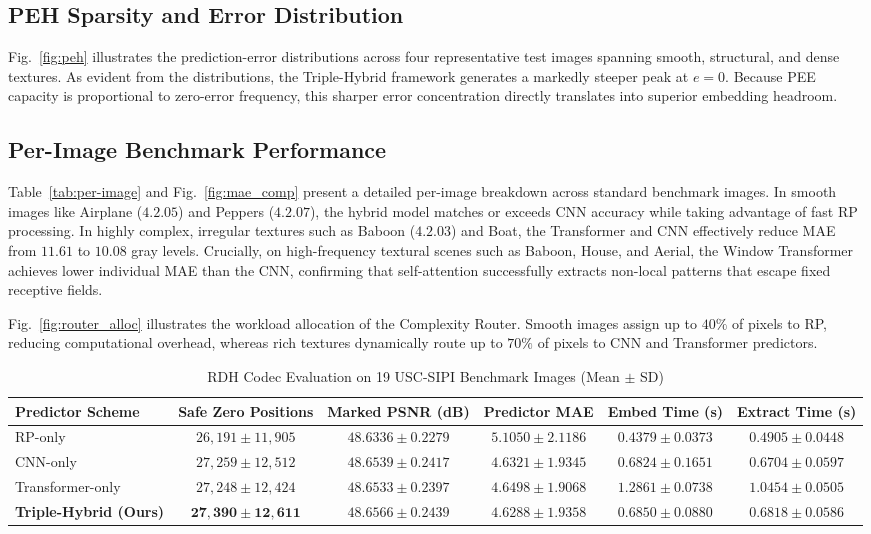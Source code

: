\documentclass[conference]{IEEEtran}
\begin{document}
\subsection{PEH Sparsity and Error Distribution}
Fig.~\ref{fig:peh} illustrates the prediction-error distributions across four representative test images spanning smooth, structural, and dense textures. As evident from the distributions, the Triple-Hybrid framework generates a markedly steeper peak at $e=0$. Because PEE capacity is proportional to zero-error frequency, this sharper error concentration directly translates into superior embedding headroom.

\subsection{Per-Image Benchmark Performance}
Table~\ref{tab:per-image} and Fig.~\ref{fig:mae_comp} present a detailed per-image breakdown across standard benchmark images. In smooth images like Airplane ($4.2.05$) and Peppers ($4.2.07$), the hybrid model matches or exceeds CNN accuracy while taking advantage of fast RP processing. In highly complex, irregular textures such as Baboon ($4.2.03$) and Boat, the Transformer and CNN effectively reduce MAE from $11.61$ to $10.08$ gray levels. Crucially, on high-frequency textural scenes such as Baboon, House, and Aerial, the Window Transformer achieves lower individual MAE than the CNN, confirming that self-attention successfully extracts non-local patterns that escape fixed receptive fields.

Fig.~\ref{fig:router_alloc} illustrates the workload allocation of the Complexity Router. Smooth images assign up to $40\%$ of pixels to RP, reducing computational overhead, whereas rich textures dynamically route up to $70\%$ of pixels to CNN and Transformer predictors.

\begin{table}[!t]
\centering
\caption{RDH Codec Evaluation on 19 USC-SIPI Benchmark Images (Mean $\pm$ SD)}
\label{tab:v2-rdh}
\small
\setlength{\tabcolsep}{10pt}
\begin{tabular*}{\textwidth}{@{\extracolsep{\fill}}lccccc@{}}
\toprule
\textbf{Predictor Scheme} & \textbf{Safe Zero Positions} & \textbf{Marked PSNR (dB)} & \textbf{Predictor MAE} & \textbf{Embed Time (s)} & \textbf{Extract Time (s)} \\
\midrule
RP-only & $26,191 \pm 11,905$ & $48.6336 \pm 0.2279$ & $5.1050 \pm 2.1186$ & $0.4379 \pm 0.0373$ & $0.4905 \pm 0.0448$ \\
CNN-only & $27,259 \pm 12,512$ & $48.6539 \pm 0.2417$ & $4.6321 \pm 1.9345$ & $0.6824 \pm 0.1651$ & $0.6704 \pm 0.0597$ \\
Transformer-only & $27,248 \pm 12,424$ & $48.6533 \pm 0.2397$ & $4.6498 \pm 1.9068$ & $1.2861 \pm 0.0738$ & $1.0454 \pm 0.0505$ \\
\textbf{Triple-Hybrid (Ours)} & $\mathbf{27,390 \pm 12,611}$ & $\mathbf{48.6566 \pm 0.2439}$ & $\mathbf{4.6288 \pm 1.9358}$ & $0.6850 \pm 0.0880$ & $0.6818 \pm 0.0586$ \\
\bottomrule
\end{tabular*}
\end{table}
\end{document}
